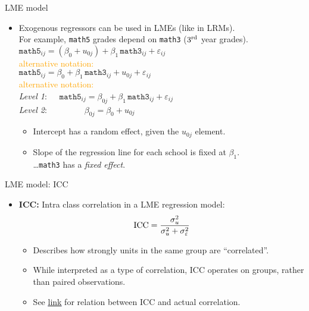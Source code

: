 \documentclass{beamer}
\begin{document}
\begin{frame}{LME model}
\small
\begin{itemize}
\item Exogenous regressors can be used in LMEs (like in LRMs).\\
\smallskip
For example, \texttt{math5} grades depend on \texttt{math3} ($3{^{\textnormal{rd}}}$ year grades).\\
\medskip
$ \texttt{math5}_{ij} = \left( \beta_{0} + u_{0j} \right) + \beta_1 \, \texttt{math3}_{ij} + \varepsilon_{ij} $\\
\bigskip
\textcolor{orange}{alternative notation:} \\ \medskip
$ \texttt{math5}_{ij} = \beta_{0} + \beta_1 \, \texttt{math3}_{ij} + u_{0j} + \varepsilon_{ij} $\\ \bigskip
\textcolor{orange}{alternative notation:} \\ \medskip
\textit{Level 1}:~~~$ \texttt{math5}_{ij} = \beta_{0j} + \beta_1 \, \texttt{math3}_{ij} + \varepsilon_{ij} $\\ \smallskip
\textit{Level 2}:~~~~~~~~~$ \beta_{0j} = \beta_{0} + u_{0j} $\\
\bigskip
\begin{itemize}
\item Intercept has a random effect, given the $u_{0j}$ element.
\smallskip
\item Slope of the regression line for each school is fixed at $\beta_1$.\\
\dots \texttt{math3} has a \textit{fixed effect}.
\end{itemize}
\end{itemize}
\end{frame}
\begin{frame}{LME model: ICC}
\small
\begin{itemize}
\item \textbf{ICC:} Intra class correlation in a LME regression model: \qquad
$$ \textnormal{ICC}=\frac{\sigma^2_u}{\sigma^2_u + \sigma^2_{\varepsilon}} $$
\begin{itemize}
    \item Describes how strongly units in the same group are ``correlated''.
    \medskip
    \item While interpreted as a type of correlation, ICC operates on groups, rather than paired observations. 
    \medskip
    \item See \textcolor{blue}{\underline{\href{https://en.wikipedia.org/wiki/Intraclass_correlation}{link}}} for relation between ICC and actual correlation.
\end{itemize}
\end{itemize}
\end{frame}
\end{document}
